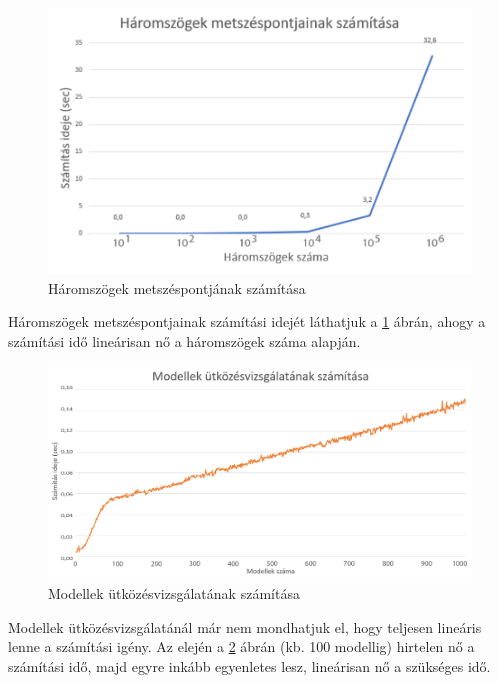 \begin{figure}[h]
	\centering
	\includegraphics[width=15truecm, height=9truecm]{images/háromszögek_száma.png}
	\caption{Háromszögek metszéspontjának számítása}
	\label{fig:szam_1}
\end{figure}

Háromszögek metszéspontjainak számítási idejét láthatjuk a \ref{fig:szam_1} ábrán, ahogy a számítási idő lineárisan nő a háromszögek száma alapján.

\newpage

\begin{figure}[h]
	\centering
	\includegraphics[width=15truecm, height=9truecm]{images/modellek_számítása.png}
	\caption{Modellek ütközésvizsgálatának számítása}
	\label{fig:szam_2}
\end{figure}

Modellek ütközésvizsgálatánál már nem mondhatjuk el, hogy teljesen lineáris lenne a számítási igény. Az elején a \ref{fig:szam_2} ábrán (kb. 100 modellig) hirtelen nő a számítási idő, majd egyre inkább egyenletes lesz, lineárisan nő a szükséges idő.